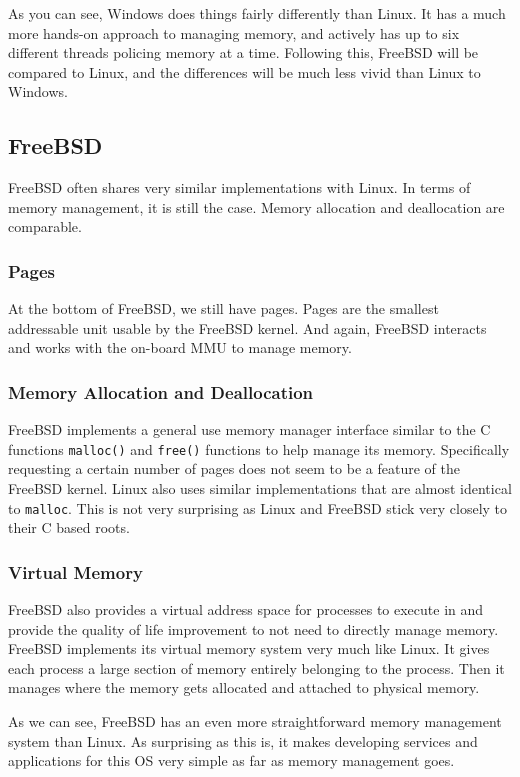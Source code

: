 \documentclass[10pt,letterpaper,onecolumn,draftclsnofoot]{IEEEtran}
\begin{document}
As you can see, Windows does things fairly differently than Linux. It has a much
more hands-on approach to managing memory, and actively has up to six different
threads policing memory at a time. Following this, FreeBSD will be compared to
Linux, and the differences will be much less vivid than Linux to Windows.

\subsection{FreeBSD}
FreeBSD often shares very similar implementations with Linux. In terms of memory
management, it is still the case. Memory allocation and deallocation are comparable. 

\subsubsection{Pages}
At the bottom of FreeBSD, we still have pages. Pages are the smallest addressable
unit usable by the FreeBSD kernel. And again, FreeBSD interacts and works with the 
on-board MMU to manage memory. 

\subsubsection{Memory Allocation and Deallocation}
FreeBSD implements a general use memory manager interface similar to the C 
functions \texttt{malloc()} and 
\texttt{free()} functions to help manage its memory. Specifically requesting 
a certain number of pages does not seem to be a feature of the FreeBSD kernel.
Linux also uses similar implementations that are almost identical to \texttt{malloc}.
This is not very surprising as Linux and FreeBSD stick very closely to their C
based roots. \cite{freebsd2016}

\subsubsection{Virtual Memory}
FreeBSD also provides a virtual address space for processes to execute in
and provide the quality of life improvement to not need to directly manage
memory. FreeBSD implements its virtual memory system very much like Linux.
It gives each process a large section of memory entirely belonging to the
process. Then it manages where the memory gets allocated and attached to
physical memory.

As we can see, FreeBSD has an even more straightforward memory management system
than Linux. As surprising as this is, it makes developing services and applications
for this OS very simple as far as memory management goes.
\end{document}
